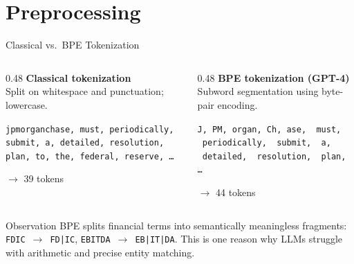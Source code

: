 \documentclass[aspectratio=169,11pt]{beamer}
\begin{document}
\section{Preprocessing}

\begin{frame}{Classical vs.\ BPE Tokenization}

\begin{columns}[T]
\begin{column}{0.48\textwidth}
\textbf{Classical tokenization}\\[4pt]
Split on whitespace and punctuation; lowercase.
\vspace{4pt}

\small
\texttt{jpmorganchase, must, periodically, submit, a, detailed,
resolution, plan, to, the, federal, reserve, \ldots}

\vspace{6pt}
$\rightarrow$ 39 tokens
\end{column}
\begin{column}{0.48\textwidth}
\textbf{BPE tokenization (GPT-4)}\\[4pt]
Subword segmentation using byte-pair encoding.
\vspace{4pt}

\small
\texttt{J, PM, organ, Ch, ase, \ must, \ periodically, \ submit,
\ a, \ detailed, \ resolution, \ plan, \ldots}

\vspace{6pt}
$\rightarrow$ 44 tokens
\end{column}
\end{columns}

\vspace{8pt}
\begin{alertblock}{Observation}
BPE splits financial terms into semantically
meaningless fragments: \texttt{FDIC}~$\to$~\texttt{FD|IC},
\texttt{EBITDA}~$\to$~\texttt{EB|IT|DA}.
This is one reason why LLMs struggle with arithmetic and
precise entity matching.
\end{alertblock}

\end{frame}
\end{document}
